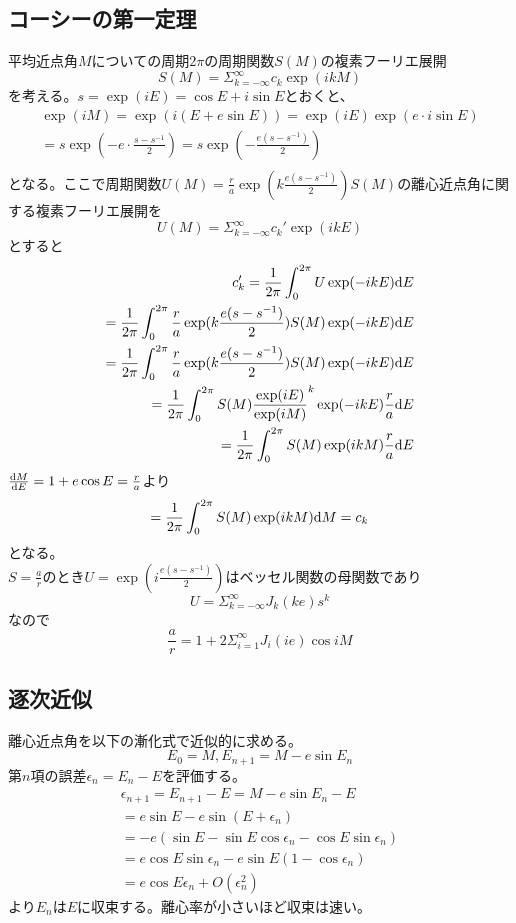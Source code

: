 	\subsection{コーシーの第一定理}
		平均近点角$M$についての周期$2\pi$の周期関数$S(M)$の複素フーリエ展開
			\[S(M) = \Sigma_{k=-\infty}^{\infty} c_k \exp(ikM)\]
		を考える。$s = \exp(iE) = \cos E + i\sin E$とおくと、
		\begin{align*}
			\exp(iM) = \exp(i(E + e\sin E)) = \exp(iE)\exp(e \cdot i\sin E)\\
			= s\exp(- e \cdot \frac{s - s^{-1}}{2}) = s\exp(- \frac{e(s - s^{-1})}{2})\\
		\end{align*}
		となる。ここで周期関数$U(M) = \frac{r}{a}\exp(k\frac{e(s - s^{-1})}{2})S(M)$の離心近点角に関する複素フーリエ展開を
			\[U(M) = \Sigma_{k=-\infty}^{\infty} c_k' \exp(ikE)\]
		とすると
		\begin{align*}
			c_k' = \frac{1}{2\pi}\int_0^{2\pi} U\exp(-ikE) \d E\\
			= \frac{1}{2\pi}\int_0^{2\pi} \frac{r}{a}\exp(k\frac{e(s - s^{-1})}{2})S(M)\exp(-ikE) \d E\\
			= \frac{1}{2\pi}\int_0^{2\pi} \frac{r}{a}\exp(k\frac{e(s - s^{-1})}{2})S(M)\exp(-ikE) \d E\\
			= \frac{1}{2\pi}\int_0^{2\pi} S(M)\frac{\exp(iE)}{\exp(iM)}^k\exp(-ikE) \frac{r}{a}\d E\\
			= \frac{1}{2\pi}\int_0^{2\pi} S(M)\exp(ikM) \frac{r}{a}\d E\\
		\end{align*}
		$\de[M]{E} = 1 + e\cos E = \frac{r}{a}$より
		\begin{align*}
			= \frac{1}{2\pi}\int_0^{2\pi} S(M)\exp(ikM) \d M = c_k
		\end{align*}
		となる。\\
		$S = \frac{a}{r}$のとき$U = \exp(i\frac{e(s - s^{-1})}{2})$はベッセル関数の母関数であり
			\[U = \Sigma_{k=-\infty}^{\infty} J_k(ke)s^k\]
		なので
			\[\frac{a}{r} = 1 + 2\Sigma_{i=1}^{\infty}J_i(ie)\cos iM\]
	\subsection{逐次近似}
		離心近点角を以下の漸化式で近似的に求める。
			\[E_0 = M, E_{n+1} = M - e\sin E_n\]
		第$n$項の誤差$\epsilon_n = E_n - E$を評価する。
		\begin{align*}
			\epsilon_{n+1} = E_{n+1} - E = M - e\sin E_n - E\\
			= e\sin E - e\sin(E + \epsilon_n)\\
			= - e(\sin E - \sin E\cos \epsilon_n - \cos E\sin \epsilon_n)\\
			= e\cos E\sin\epsilon_n - e\sin E(1 - \cos\epsilon_n)\\
			= e\cos E\epsilon_n + O(\epsilon_n^2)
		\end{align*}
		より$E_n$は$E$に収束する。離心率が小さいほど収束は速い。
